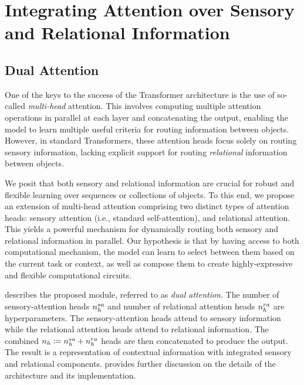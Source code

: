 \section{Integrating Attention over Sensory and Relational Information}

\subsection{Dual Attention}

One of the keys to the success of the Transformer architecture is the use of so-called \textit{multi-head} attention. This involves computing multiple attention operations in parallel at each layer and concatenating the output, enabling the model to learn multiple useful criteria for routing information between objects.  However, in standard Transformers, these attention heads focus solely on routing sensory information, lacking explicit support for routing \textit{relational} information between objects.

We posit that both sensory and relational information are crucial for robust and flexible learning over sequences or collections of objects. To this end, we propose an extension of multi-head attention comprising two distinct types of attention heads: sensory attention (i.e., standard self-attention), and relational attention. This yields a powerful mechanism for dynamically routing both sensory and relational information in parallel. Our hypothesis is that by having access to both computational mechanism, the model can learn to select between them based on the current task or context, as well as compose them to create highly-expressive and flexible computational circuits.

 describes the proposed module, referred to as \textit{dual attention}. The number of sensory-attention heads $n_h^{sa}$ and number of relational attention heads $n_h^{ra}$ are hyperparameters. The sensory-attention heads attend to sensory information while the relational attention heads attend to relational information. The combined $n_h \coloneq n_h^{sa} + n_h^{ra}$ heads are then concatenated to produce the output. The result is a representation of contextual information with integrated sensory and relational components.  provides further discussion on the details of the architecture and its implementation.

